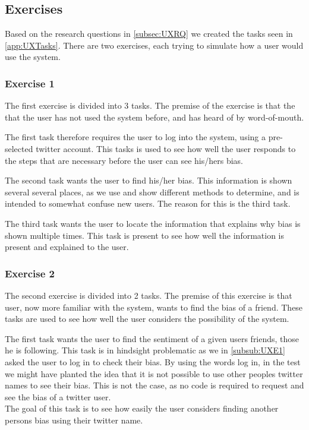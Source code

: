 \subsection{Exercises}
Based on the research questions in \autoref{subsec:UXRQ} we created the tasks
seen in \autoref{app:UXTasks}. There are two exercises, each trying to simulate
how a user would use the system.\nl

\subsubsection{Exercise 1}\label{subsub:UXE1}
The first exercise is divided into 3 tasks. The premise of the exercise is that
the that the user has not used the system before, and has heard of by
word-of-mouth.\nl

The first task therefore requires the user to log into the system, using a
pre-selected twitter account. This tasks is used to see how well the user
responds to the steps that are necessary before the user can see his/hers
bias.\nl

The second task wants the user to find his/her bias. This information is shown
several several places, as we use and show different methods to determine, and
is intended to somewhat confuse new users. The reason for this is the third
task.\nl

The third task wants the user to locate the information that explains why bias
is shown multiple times. This task is present to see how well the information
is present and explained to the user.

\subsubsection{Exercise 2}
The second exercise is divided into 2 tasks. The premise of this exercise is
that user, now more familiar with the system, wants to find the bias of a
friend. These tasks are used to see how well the user considers the possibility
of the system.\nl

The first task wants the user to find the sentiment of a given users
friends, those he is following. This task is in hindsight problematic as we in
\autoref{subsub:UXE1} asked the user to log in to check their bias. By using
the words log in, in the test we might have planted the idea that it is not
possible to use other peoples twitter names to see their bias. This is not the
case, as no code is required to request and see the bias of a twitter user.\\
The goal of this task is to see how easily the user considers finding
another persons bias using their twitter name.\nl

